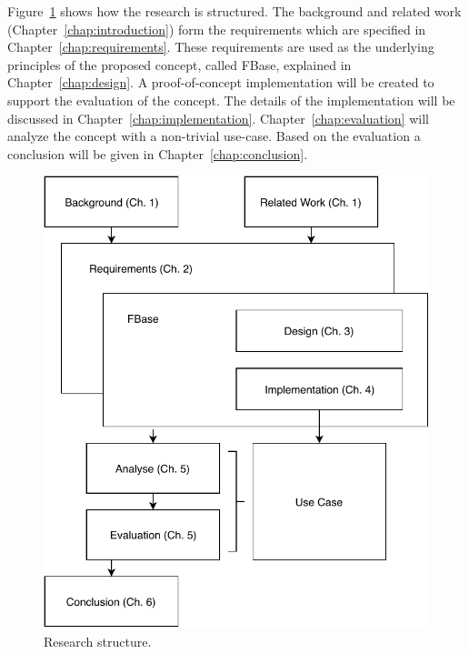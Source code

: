 
Figure~\ref{fig:reading-guide} shows how the research is structured. The background and related work (Chapter~\ref{chap:introduction}) form the requirements which are specified in Chapter~\ref{chap:requirements}. These requirements are used as the underlying principles of the proposed concept, called FBase, explained in Chapter~\ref{chap:design}. A proof-of-concept implementation will be created to support the evaluation of the concept. The details of the implementation will be discussed in Chapter~\ref{chap:implementation}. Chapter~\ref{chap:evaluation} will analyze the concept with a non-trivial use-case. Based on the evaluation a conclusion will be given in Chapter~\ref{chap:conclusion}. 


\vspace{0.1cm}

\begin{figure}[h]
	\centering
	\includegraphics[width=1\textwidth]{images/intro-reading-guide.pdf}
	\caption{\label{fig:reading-guide} Research structure.}
\end{figure}
